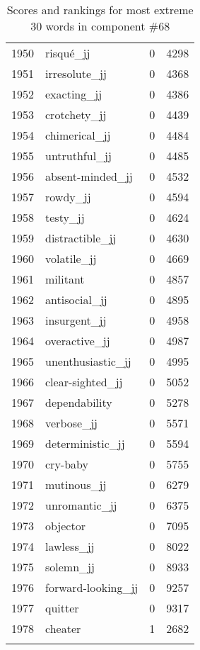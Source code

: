 \begin{longtable}[!htbp]{| rlr@{.}l |}
    1950 & risqué\_jj & 0 & 4298 \\
    1951 & irresolute\_jj & 0 & 4368 \\
    1952 & exacting\_jj & 0 & 4386 \\
    1953 & crotchety\_jj & 0 & 4439 \\
    1954 & chimerical\_jj & 0 & 4484 \\
    1955 & untruthful\_jj & 0 & 4485 \\
    1956 & absent-minded\_jj & 0 & 4532 \\
    1957 & rowdy\_jj & 0 & 4594 \\
    1958 & testy\_jj & 0 & 4624 \\
    1959 & distractible\_jj & 0 & 4630 \\
    1960 & volatile\_jj & 0 & 4669 \\
    1961 & militant & 0 & 4857 \\
    1962 & antisocial\_jj & 0 & 4895 \\
    1963 & insurgent\_jj & 0 & 4958 \\
    1964 & overactive\_jj & 0 & 4987 \\
    1965 & unenthusiastic\_jj & 0 & 4995 \\
    1966 & clear-sighted\_jj & 0 & 5052 \\
    1967 & dependability & 0 & 5278 \\
    1968 & verbose\_jj & 0 & 5571 \\
    1969 & deterministic\_jj & 0 & 5594 \\
    1970 & cry-baby & 0 & 5755 \\
    1971 & mutinous\_jj & 0 & 6279 \\
    1972 & unromantic\_jj & 0 & 6375 \\
    1973 & objector & 0 & 7095 \\
    1974 & lawless\_jj & 0 & 8022 \\
    1975 & solemn\_jj & 0 & 8933 \\
    1976 & forward-looking\_jj & 0 & 9257 \\
    1977 & quitter & 0 & 9317 \\
    1978 & cheater & 1 & 2682 \\
    \hline
    \caption{Scores and rankings for most extreme 30 words in component \#68} \\
\end{longtable}
